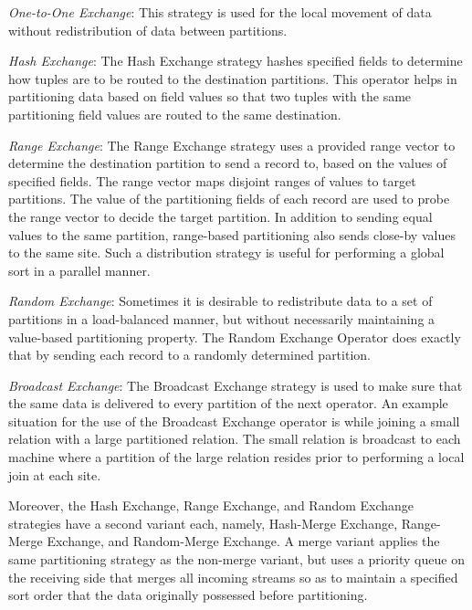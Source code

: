 \begin{asparaitem}

\item {\em One-to-One Exchange}: This strategy is used for the local movement of data without redistribution of
data between partitions.

\item {\em Hash Exchange}: The Hash Exchange strategy hashes specified fields to determine how tuples are to be routed to the destination
partitions. This operator helps in partitioning data based on field values so that two tuples with the same partitioning field
values are routed to the same destination.

\item {\em Range Exchange}: The Range Exchange strategy uses a provided range vector to determine the destination partition to send a record to, based on the values of specified fields. 
The range vector maps disjoint ranges of values to target partitions. The value of the partitioning fields of each record are used to probe the range vector to decide the target partition. 
In addition to sending equal values to the same partition, range-based partitioning also sends close-by values to the same site. 
Such a distribution strategy is useful for performing a global sort in a parallel manner.

\item {\em Random Exchange}: Sometimes it is desirable to redistribute data to a set of partitions in a load-balanced manner, but without necessarily maintaining a value-based partitioning property. 
The Random Exchange Operator does exactly that by sending each record to a randomly determined partition.

\item {\em Broadcast Exchange}: The Broadcast Exchange strategy is used to make sure that the same data is delivered to every partition of the next operator. 
An example situation for the use of the Broadcast Exchange operator is while joining a small relation with a large partitioned relation. 
The small relation is broadcast to each machine where a partition of the large relation resides prior to performing a local join at each site.

\end{asparaitem}


Moreover, the Hash Exchange, Range Exchange, and Random Exchange strategies have a second variant each, namely, Hash-Merge Exchange, Range-Merge Exchange, and Random-Merge Exchange. A merge variant applies the same partitioning strategy as the non-merge variant, but uses a priority queue on the receiving side that merges all incoming streams so as to maintain a specified sort order that the data originally possessed before partitioning. 



